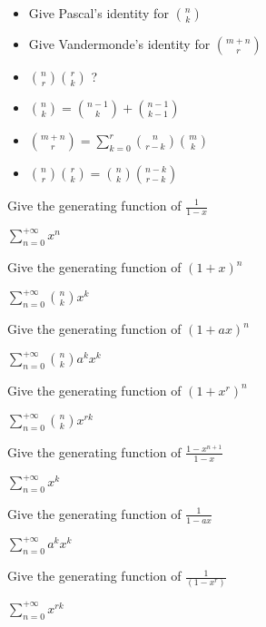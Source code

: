 \documentclass[12pt]{article}
\newcommand*{\xfield}[1]{\begin{mdframed}\centering #1\end{mdframed}\bigskip}
\newenvironment{note}{}{}
\begin{document}
\begin{note}
	\xfield{\begin{itemize}
	\item Give Pascal's identity for $\binom{n}{k}$
	\item Give Vandermonde's identity for $\binom{m+n}{r}$
	\item $\binom{n}{r}\binom{r}{k}$ ?
	\end{itemize} }
	\xfield{\begin{itemize}
	\item $\binom{n}{k} = \binom{n-1}{k} + \binom{n-1}{k-1}$
	\item  $\binom{m+n}{r} = \sum\limits^{r}_{k=0} \binom{n}{r-k}\binom{m}{k}$
	\item $\binom{n}{r}\binom{r}{k}=\binom{n}{k}\binom{n-k}{r-k}$
	\end{itemize} }
\end{note}

\begin{note}
	\xfield{Give the generating function of $\frac{1}{1-x}$}
	\xfield{$\sum\limits_{n=0}^{+{\infty}}{x^n}$}
\end{note}

\begin{note}
	\xfield{Give the generating function of $(1+x)^n$}
	\xfield{$\sum\limits_{n=0}^{+{\infty}}{\binom{n}{k}x^k}$}
\end{note}

\begin{note}
	\xfield{Give the generating function of $(1+ax)^n$}
	\xfield{$\sum\limits_{n=0}^{+{\infty}}{\binom{n}{k}a^kx^k}$}
\end{note}

\begin{note}
	\xfield{Give the generating function of $(1+x^r)^n$}
	\xfield{$\sum\limits_{n=0}^{+{\infty}}{\binom{n}{k}x^{rk}}$}
\end{note}

\begin{note}
	\xfield{Give the generating function of $\frac{1-x^{n+1}}{1-x}$}
	\xfield{$\sum\limits_{n=0}^{+{\infty}}{x^k}$}
\end{note}

\begin{note}
	\xfield{Give the generating function of $\frac{1}{1-ax}$}
	\xfield{$\sum\limits_{n=0}^{+{\infty}}{a^kx^k}$}
\end{note}

\begin{note}
	\xfield{Give the generating function of $\frac{1}{(1-x^r)}$}
	\xfield{$\sum\limits_{n=0}^{+{\infty}}{x^{rk}}$}
\end{note}
\end{document}
